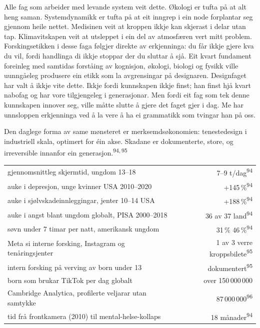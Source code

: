 \begin{widebody}
{Alle fag som arbeider med levande system veit dette. Økologi er tufta på at alt heng saman. Systemdynamikk er tufta på at eit inngrep i ein node forplantar seg gjennom heile nettet. Medisinen veit at kroppen ikkje kan skjerast i delar utan tap. Klimavitskapen veit at utsleppet i ein del av atmosfæren vert mitt problem. Forskingsetikken i desse faga følgjer direkte av erkjenninga: du får ikkje gjere kva du vil, fordi handlinga di ikkje stoppar der du sluttar å sjå. Eit kvart fundament foreinleg med samtidas forståing av kognisjon, økologi, biologi og fysikk ville uunngåeleg produsere ein etikk som la avgrensingar på designaren. Designfaget har valt å ikkje vite dette. Ikkje fordi kunnskapen ikkje finst; han finst hjå kvart nabofag og har vore tilgjengeleg i generasjonar. Men fordi eit fag som tek denne kunnskapen innover seg, ville måtte slutte å gjere det faget gjer i dag. Me har unnsloppen erkjenninga ved å la vere å ha ei grammatikk som tvingar han på oss.

Den daglege forma av same mønsteret er merksemdsøkonomien: tenestedesign i industriell skala, optimert for éin akse. Skadane er dokumenterte, store, og irreversible innanfor ein generasjon.\textsuperscript{94,\,95}

\begin{center}
\footnotesize
\renewcommand{\arraystretch}{1.15}
\begin{tabular}{@{}p{58mm}r@{}}
\toprule
gjennomsnittleg skjermtid, ungdom 13--18 & 7--9 t/dag\textsuperscript{94} \\
auke i depresjon, unge kvinner USA 2010--2020 & +145\,\%\textsuperscript{94} \\
auke i sjølvskadeinnleggingar, jenter 10--14 USA & +188\,\%\textsuperscript{94} \\
auke i angst blant ungdom globalt, PISA 2000--2018 & 36 av 37 land\textsuperscript{94} \\
søvn under 7 timar per natt, amerikansk ungdom & 31\,\%\,\msym{→}\,46\,\%\textsuperscript{94} \\
Meta si interne forsking, Instagram og tenåringsjenter & 1 av 3 verre kroppsbilete\textsuperscript{95} \\
intern forsking på verving av born under 13 & dokumentert\textsuperscript{95} \\
born som brukar TikTok per dag globalt & over 150\,000\,000 \\
Cambridge Analytica, profilerte veljarar utan samtykke & 87\,000\,000\textsuperscript{96} \\
tid frå frontkamera (2010) til mental-helse-kollaps & 18 månader\textsuperscript{94} \\
\bottomrule
\end{tabular}
\end{center}

}
\end{widebody}
